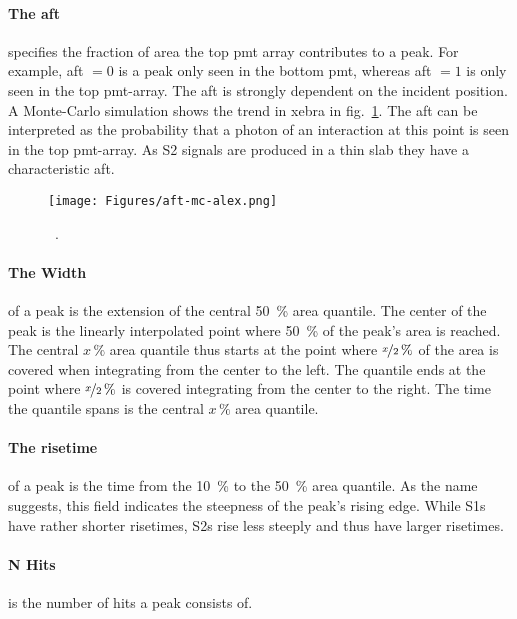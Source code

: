 \paragraph{The \gls{aft}} specifies the fraction of area the top \gls{pmt} array contributes to a peak.
For example, \gls{aft} $ = 0 $ is a peak only seen in the bottom \gls{pmt}, whereas \gls{aft} $ = 1 $ is only seen in the top \gls{pmt}-array.
The \gls{aft} is strongly dependent on the incident position.
A Monte-Carlo simulation shows the trend in \gls{xebra} in fig.~\ref{fig:aft-mc}.
The \gls{aft} can be interpreted as the probability that a photon of an interaction at this point is seen in the top \gls{pmt}-array.
As S2 signals are produced in a thin slab they have a characteristic \gls{aft}.

\begin{figure}
\centering
\texttt{[image: Figures/aft-mc-alex.png]}  %
    \caption[AFT in XeBRA Simulated]{
        ~\cite{ABism}.
    }
\label{fig:aft-mc}
\end{figure}

\paragraph{The Width} of a peak is the extension of the central \SI{50}{\%} area quantile.
The center of the peak is the linearly interpolated point where \SI{50}{\%} of the peak's area is reached.
The central $ x\,\% $ area quantile thus starts at the point where $ \nicefrac{x}{2}\,\% $ of the area is covered when integrating from the center to the left.
The quantile ends at the point where $ \nicefrac{x}{2}\,\% $ is covered integrating from the center to the right.
The time the quantile spans is the central $ x\,\% $ area quantile.

\paragraph{The risetime} of a peak is the time from the \SI{10}{\%} to the \SI{50}{\%} area quantile.
As the name suggests, this field indicates the steepness of the peak's rising edge.
While S1s have rather shorter risetimes, S2s rise less steeply and thus have larger risetimes.

\paragraph{N Hits} is the number of hits a peak consists of.

